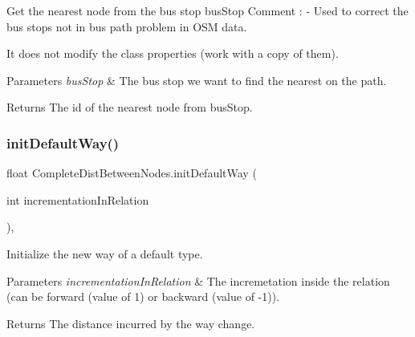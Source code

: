 Get the nearest node from the bus stop \textquotesingle{}bus\+Stop\textquotesingle{} Comment \+: -\/ Used to correct the bus stops not in bus path problem in O\+SM data. 


\begin{DoxyItemize}
\item It does not modify the class properties (work with a copy of them). 
\end{DoxyItemize}


\begin{DoxyParams}{Parameters}
{\em bus\+Stop} & The bus stop we want to find the nearest on the path.\\
\hline
\end{DoxyParams}
\begin{DoxyReturn}{Returns}
The id of the nearest node from \textquotesingle{}bus\+Stop\textquotesingle{}.
\end{DoxyReturn}
\mbox{\label{classCompleteDistBetweenNodes_ad81f518273914101230509348b84504d}} 
\subsubsection{\texorpdfstring{init\+Default\+Way()}{initDefaultWay()}}
{\footnotesize\ttfamily float Complete\+Dist\+Between\+Nodes.\+init\+Default\+Way (\begin{DoxyParamCaption}\item[{int}]{incrementation\+In\+Relation }\end{DoxyParamCaption})\hspace{0.3cm}{\ttfamily [inline]}, {\ttfamily [private]}}



Initialize the new way of a default type. 


\begin{DoxyParams}{Parameters}
{\em incrementation\+In\+Relation} & The incremetation inside the relation (can be forward (value of 1) or backward (value of -\/1)).\\
\hline
\end{DoxyParams}
\begin{DoxyReturn}{Returns}
The distance incurred by the way change.
\end{DoxyReturn}
\mbox{\label{classCompleteDistBetweenNodes_a9061932715a421c475b73f3024cd2586}} 
